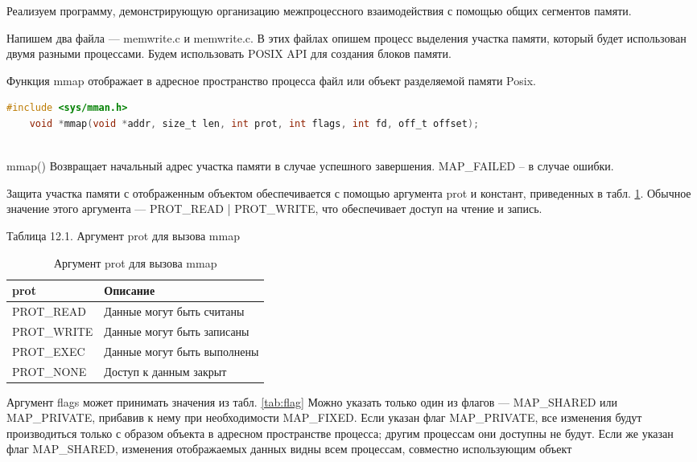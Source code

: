 \documentclass[a4paper,14pt]{extarticle}
\begin{document}
Реализуем программу, демонстрирующую организацию межпроцессного взаимодействия с помощью общих сегментов памяти.

Напишем два файла --- memwrite.c и memwrite.c. В этих файлах опишем процесс выделения участка памяти, который будет использован двумя разными процессами. Будем использовать POSIX API для создания блоков памяти.


Функция mmap отображает в адресное пространство процесса файл или объект разделяемой памяти Posix. 
\begin{lstlisting}[language=C]
	#include <sys/mman.h>
	void *mmap(void *addr, size_t len, int prot, int flags, int fd, off_t offset);
	
\end{lstlisting}
	mmap() Возвращает начальный адрес участка памяти в случае успешного завершения. MAP\_FAILED – в случае ошибки.

 
 Защита участка памяти с отображенным объектом обеспечивается с помощью аргумента prot и констант, приведенных в табл. \ref{tab:prot}. Обычное значение этого аргумента — PROT\_READ | PROT\_WRITE, что обеспечивает доступ на чтение и запись.
 
 Таблица 12.1. Аргумент prot для вызова mmap
 
 
 \begin{table}[h!]
 	\centering
 	\caption{Аргумент prot для вызова mmap}
 	\begin{tabular}{|l|l|}
 		\hline
 		\textbf{prot} & \textbf{Описание} \\ \hline
 		PROT\_READ & Данные могут быть считаны \\ \hline
 		PROT\_WRITE & Данные могут быть записаны \\ \hline
 		PROT\_EXEC & Данные могут быть выполнены \\ \hline
 		PROT\_NONE & Доступ к данным закрыт \\ \hline
 	\end{tabular}
 	\label{tab:prot}
 \end{table}

Аргумент flags может принимать значения из табл. \ref{tab:flag} Можно указать только один из флагов — MAP\_SHARED или MAP\_PRIVATE, прибавив к нему при необходимости MAP\_FIXED. Если указан флаг MAP\_PRIVATE, все изменения будут производиться только с образом объекта в адресном пространстве процесса; другим процессам они доступны не будут. Если же указан флаг MAP\_SHARED, изменения отображаемых данных видны всем процессам, совместно использующим объект
 
\end{document}
